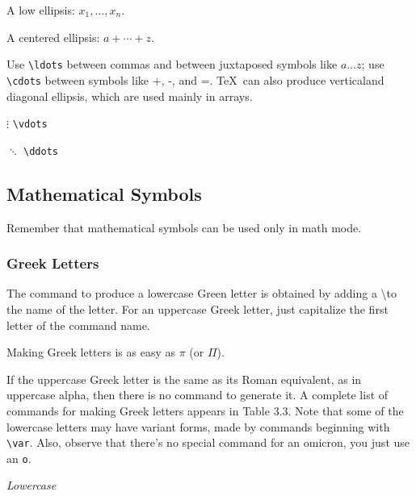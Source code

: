 \documentclass[twocolumn]{book}        %
\begin{document}
A low ellipsis: $x_{1}, \ldots ,x_{n}$.

A centered ellipsis: $a + \cdots + z$.

Use \texttt{\textbackslash ldots} between commas and between juxtaposed symbols like $a\ldots z$; 
use \texttt{\textbackslash cdots} between symbols like +, -, and =. \TeX\ can also produce verticaland
diagonal ellipsis, which are used mainly in arrays.

$\vdots$ \texttt{\textbackslash vdots}

$\ddots$ \texttt{\textbackslash ddots}

\subsection{Mathematical Symbols}

Remember that mathematical symbols can be used only in math mode.

\subsubsection{Greek Letters}

The command to produce a lowercase Green letter is obtained by adding a \textbackslash to
the name of the letter. For an uppercase Greek letter, just capitalize the first letter of 
the command name.

Making Greek letters is as easy as $\pi$ (or $\Pi$).

If the uppercase Greek letter is the same as its Roman equivalent, as in uppercase alpha,
then there is no command to generate it. A complete list of commands for making Greek
letters appears in Table 3.3. Note that some of the lowercase letters may have variant forms,
made by commands beginning with  \texttt{\textbackslash var}. Also, observe that there's no
special command for an omicron, you just use an \texttt{o}.

\emph{Lowercase}
\end{document}
